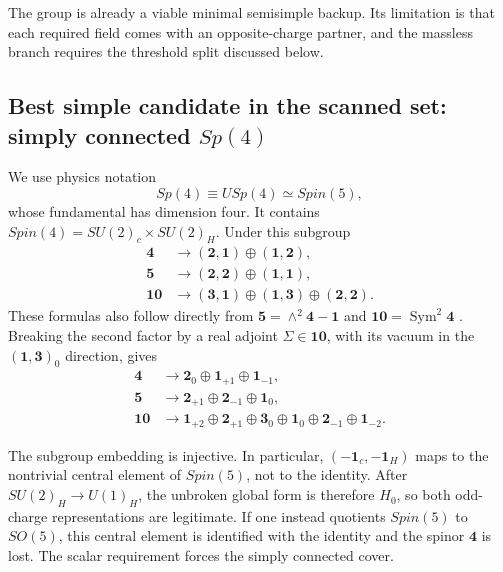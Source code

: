 \documentclass[11pt]{article}
\theoremstyle{definition}
\theoremstyle{remark}
\begin{document}
The group is already a viable minimal semisimple backup.  Its limitation is
that each required field comes with an opposite-charge partner, and the
massless branch requires the threshold split discussed below.

\subsection{Best simple candidate in the scanned set: simply connected
\texorpdfstring{\(Sp(4)\)}{Sp(4)}}

We use physics notation
\begin{equation}
 Sp(4)\equiv USp(4)\simeq Spin(5),
 \label{eq:sp4-notation}
\end{equation}
whose fundamental has dimension four.  It contains
\(Spin(4)=SU(2)_c\times SU(2)_H\).  Under this subgroup
\begin{align}
 \bm4&\to(\bm2,\bm1)\oplus(\bm1,\bm2),
 \label{eq:sp4-4-spin4}\\
 \bm5&\to(\bm2,\bm2)\oplus(\bm1,\bm1),
 \label{eq:sp4-5-spin4}\\
 \bm{10}&\to(\bm3,\bm1)\oplus(\bm1,\bm3)
                    \oplus(\bm2,\bm2).
 \label{eq:sp4-10-spin4}
\end{align}
These formulas also follow directly from
\(\bm5=\wedge^2\bm4-\bm1\) and
\(\bm{10}=\operatorname{Sym}^2\bm4\)
\cite{Slansky1981}.  Breaking the second factor by a real adjoint
\(\Sigma\in\bm{10}\), with its vacuum in the
\((\bm1,\bm3)_0\) direction, gives
\begin{align}
 \bm4&\to\bm2_0\oplus\bm1_{+1}\oplus\bm1_{-1},
 \label{eq:sp4-4}\\
 \bm5&\to\bm2_{+1}\oplus\bm2_{-1}\oplus\bm1_0,
 \label{eq:sp4-5}\\
 \bm{10}&\to
 \bm1_{+2}\oplus\bm2_{+1}\oplus\bm3_0\oplus\bm1_0
 \oplus\bm2_{-1}\oplus\bm1_{-2}.
 \label{eq:sp4-10}
\end{align}

The subgroup embedding is injective.  In particular,
\((-\bm1_c,-\bm1_H)\) maps to the nontrivial central element of \(Spin(5)\),
not to the identity.  After \(SU(2)_H\to U(1)_H\), the unbroken global form
is therefore \(H_0\), so both odd-charge representations are legitimate.
If one instead quotients \(Spin(5)\) to \(SO(5)\), this central element is
identified with the identity and the spinor \(\bm4\) is lost.  The scalar
requirement forces the simply connected cover.
\end{document}
